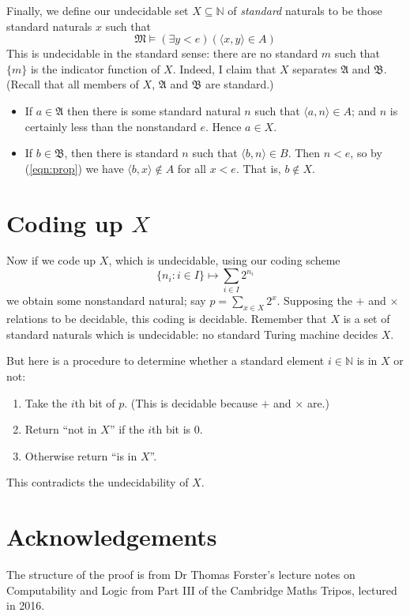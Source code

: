 \documentclass[11pt]{amsart}
\theoremstyle{remark}
\begin{document}
Finally, we define our undecidable set $X \subseteq \mathbb{N}$ of \emph{standard} naturals to be those standard naturals $x$ such that $$\mathfrak{M} \vDash (\exists y < e) (\langle x, y \rangle \in A)$$
This is undecidable in the standard sense: there are no standard $m$ such that $\{m \}$ is the indicator function of $X$.
Indeed, I claim that $X$ separates $\mathfrak{A}$ and $\mathfrak{B}$.
(Recall that all members of $X$, $\mathfrak{A}$ and $\mathfrak{B}$ are standard.)

\begin{itemize}
\item If $a \in \mathfrak{A}$ then there is some standard natural $n$ such that $\langle a, n \rangle \in A$;
and $n$ is certainly less than the nonstandard $e$.
Hence $a \in X$.
\item If $b \in \mathfrak{B}$, then there is standard $n$ such that $\langle b, n \rangle \in B$.
Then $n < e$, so by (\ref{eqn:prop}) we have $\langle b, x \rangle \not \in A$ for all $x < e$.
That is, $b \not \in X$.
\end{itemize}

\section{Coding up \texorpdfstring{$X$}{X}}
Now if we code up $X$, which is undecidable, using our coding scheme $$\{ n_i : i \in I \} \mapsto \sum_{i \in I} 2^{n_i}$$
we obtain some nonstandard natural; say $p = \sum_{x \in X} 2^x$.
Supposing the $+$ and $\times$ relations to be decidable, this coding is decidable.
Remember that $X$ is a set of standard naturals which is undecidable: no standard Turing machine decides $X$.

But here is a procedure to determine whether a standard element $i \in \mathbb{N}$ is in $X$ or not:

\begin{enumerate}
\item Take the $i$th bit of $p$. (This is decidable because $+$ and $\times$ are.)
\item Return ``not in $X$'' if the $i$th bit is $0$.
\item Otherwise return ``is in $X$''.
\end{enumerate}

This contradicts the undecidability of $X$.

\section{Acknowledgements}
The structure of the proof is from Dr Thomas Forster's lecture notes on Computability and Logic from Part III of the Cambridge Maths Tripos, lectured in 2016.
\end{document}
